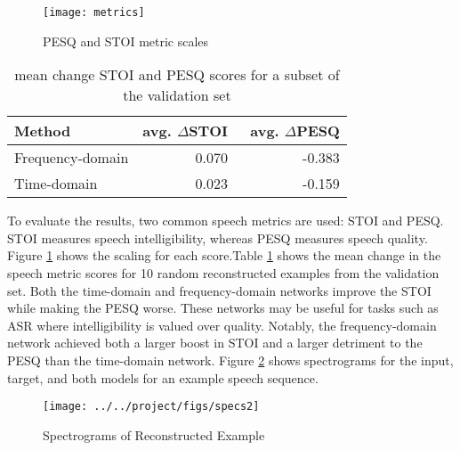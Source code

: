 \begin{figure}
	\centering
	\texttt{[image: metrics]}
	\caption{\ac{PESQ} and \ac{STOI} metric scales}
	\label{fig:metrics}
\end{figure}

\begin{table}
	\centering
	\caption{mean change STOI and PESQ scores for a subset of the validation set}
	\label{tab:results}
	\resizebox{0.5\textwidth}{!} {
	\begin{tabular}{lrr}
	\toprule
			  Method &  avg. $\Delta$STOI &  \ avg. $\Delta$PESQ \\
	\midrule
	Frequency-domain &         0.070 &        -0.383 \\
		 Time-domain &         0.023 &        -0.159 \\
	\bottomrule
	\end{tabular}
	}
\end{table}

To evaluate the results, two common speech metrics are used: \ac{STOI} and \ac{PESQ}. \ac{STOI} measures speech intelligibility, whereas \ac{PESQ} measures speech quality. Figure \ref{fig:metrics} shows the scaling for each score.Table \ref{tab:results} shows the mean change in the speech metric scores for 10 random reconstructed examples from the validation set. Both the time-domain and frequency-domain networks improve the \ac{STOI} while making the \ac{PESQ} worse. These networks may be useful for tasks such as \ac{ASR} where intelligibility is valued over quality. Notably, the frequency-domain network achieved both a larger boost in \ac{STOI} and a larger detriment to the \ac{PESQ} than the time-domain network. Figure \ref{fig:specs} shows spectrograms for the input, target, and both models for an example speech sequence.

\begin{figure}
	\centering
	\texttt{[image: ../../project/figs/specs2]}
	\caption{Spectrograms of Reconstructed Example}
	\label{fig:specs}
\end{figure}

